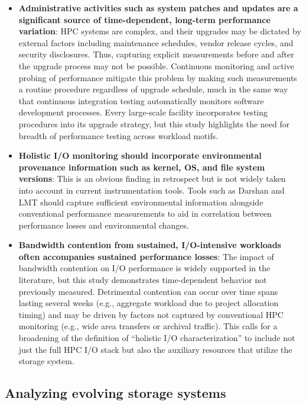 \begin{itemize}[leftmargin=*]

\item \textbf{Administrative activities such as system patches and updates are a significant source of time-dependent, long-term performance variation}:
HPC systems are complex, and their upgrades may be dictated by external factors including maintenance schedules, vendor release cycles, and security disclosures.
Thus, capturing explicit measurements before and after the upgrade process may not be possible.
Continuous monitoring and active probing of performance mitigate this
problem by making such measurements a routine procedure regardless of
upgrade schedule, much in the same way that continuous integration testing automatically monitors software development processes.
Every large-scale facility incorporates testing procedures into its upgrade
strategy, but this study highlights the need for breadth of performance
testing across workload motifs.

\item \textbf{Holistic I/O monitoring should incorporate environmental
provenance information such as kernel, OS, and file system versions}: 
This is an obvious finding in retrospect but is not widely taken into
account in current instrumentation tools.
Tools such as Darshan and LMT should capture sufficient environmental information alongside conventional performance measurements 
to aid in correlation between performance losses and environmental changes.

\item \textbf{Bandwidth contention from sustained, I/O-intensive workloads often accompanies sustained performance losses}:
The impact of bandwidth contention on I/O performance is widely supported in the literature, but this study demonstrates time-dependent behavior not previously measured.
Detrimental contention can occur over time spans lasting several weeks (e.g., aggregate workload due to project allocation timing) and may be driven by factors 
not captured by conventional HPC monitoring (e.g., wide area transfers or archival traffic).
This calls for a broadening of the definition of ``holistic I/O characterization'' to include not just the full HPC I/O stack but also the auxiliary resources that utilize the storage system.

\end{itemize}


\subsection{Analyzing evolving storage systems}

